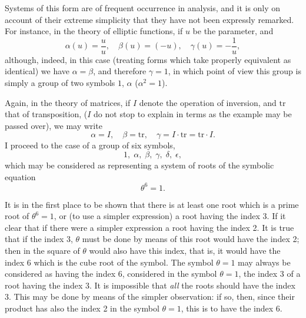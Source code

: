 \documentclass[11pt,a4paper]{article}
\theoremstyle{definition}
\begin{document}
Systems of this form are of frequent occurrence in analysis, and it is only on
account of their extreme simplicity that they have not been expressly remarked. For
instance, in the theory of elliptic functions, if $u$ be the parameter, and
\[
\alpha(u) = \frac{u}{u},\quad\beta(u) = (-u),\quad\gamma(u) = -\frac{1}{u},
\]
although, indeed, in this case (treating forms which take properly equivalent as identical)
we have $\alpha = \beta$, and therefore $\gamma = 1$, in which point of view this group is simply a
group of two symbols $1$, $\alpha$ ($\alpha^2=1$).

\medskip

Again, in the theory of matrices, if $I$ denote the operation of inversion, and $\mathrm{tr}$
that of transposition, ($I$ do not stop to explain in terms as the example may be
passed over), we may write
\[
\alpha = I,\quad\beta = \mathrm{tr},\quad\gamma = I\cdot\mathrm{tr} = \mathrm{tr}\cdot I.
\]
I proceed to the case of a group of six symbols,
\[
1,\;\alpha,\;\beta,\;\gamma,\;\delta,\;\epsilon,
\]
which may be considered as representing a system of roots of the symbolic equation
\[
\theta^6 = 1.
\]

\medskip

It is in the first place to be shown that there is at least one root which is a
prime root of $\theta^6=1$, or (to use a simpler expression) a root having the index 3. If
it clear that if there were a simpler expression a root having the index 2. It
is true that if the index 3, $\theta$ must be done by means
of this root would have the index 2; then in the square of $\theta$ would also have
this index, that is, it would have the index 6 which is the cube root of the symbol.
The symbol $\theta = 1$ may always be considered as having the index 6, considered
in the symbol $\theta = 1$, the index 3 of a root having the index 3. It
is impossible that \textit{all} the roots should have the index 3. This may be done by means
of the simpler observation: if so, then, since their product has also the index 2 in
the symbol $\theta = 1$, this is to have the index 6.

\medskip
\end{document}
